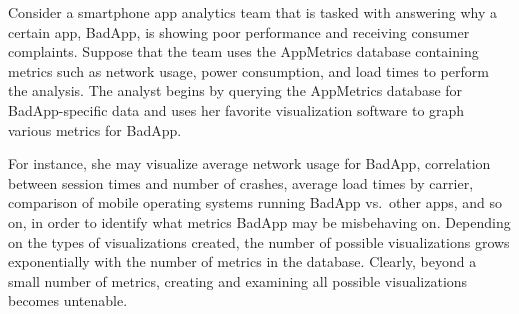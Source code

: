 \begin{example}
Consider a smartphone app analytics team that is tasked with answering why a certain app, 
BadApp, is showing poor performance and receiving consumer complaints. 
Suppose that the team uses the AppMetrics database containing metrics such as network usage, 
power consumption, and load times to perform the analysis.
The analyst begins by querying the AppMetrics database for BadApp-specific data and uses her 
favorite visualization software to graph various metrics for BadApp.

For instance, she may visualize average network usage for BadApp, 
correlation between session times and number of crashes, average load times by carrier, 
comparison of mobile operating systems running BadApp vs.~other apps, and so on,
in order to identify what metrics BadApp may be misbehaving on.
Depending on the types of visualizations created, the number of possible 
visualizations grows exponentially with the number of metrics in the database.
Clearly, beyond a small number of metrics, creating and examining all possible visualizations
becomes untenable.





\end{example}
